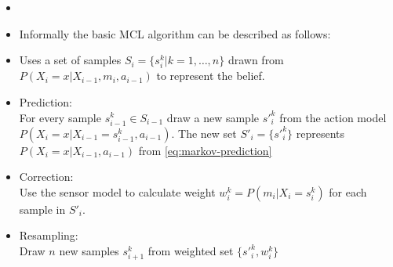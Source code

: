 \begin{itemize}
\item\cite{dellaert99}
\item Informally the basic MCL algorithm can be described as follows:

\item Uses a set of samples \(S_i = \{s^k_{i} | k = 1,\dotsc,n\} \) drawn from
	\(P(X_i = x | X_{i-1}, m_i, a_{i - 1})\) to represent the belief.

\item Prediction:\\
	For every sample \(s^k_{i-1} \in S_{i-1}\) draw a new sample \(s'^k_{i}\)
	from the action model \(P(X_i = x | X_{i-1} = s^k_{i-1}, a_{i - 1})\).
	The new set \(S'_i = \{s'^k_{i}\} \) represents
	\(P(X_i = x | X_{i - 1}, a_{i - 1})\) from 
	\eqref{eq:markov-prediction}

\item Correction:\\
	Use the sensor model to calculate weight \(w^k_i = P(m_i | X_i = s^k_i)\)
	for each sample in \(S'_i\).

\item Resampling:\\
	Draw \(n\) new samples \(s^k_{i+1}\) from weighted set \(\{s'^k_i, w^k_i\}\)
\end{itemize}
